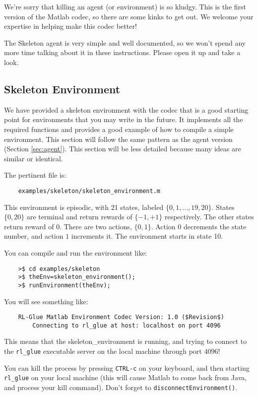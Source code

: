 \documentclass[11pt]{article}
\begin{document}
We're sorry that killing an agent (or environment) is so kludgy.  This is the first version of the Matlab codec, so there are some kinks to get out.  We welcome your expertise in helping 
make this codec better!

The Skeleton agent is very simple and well documented, so we won't spend any more time talking about it in these instructions.
Please open it up and take a look.

\subsection{Skeleton Environment}
\label{sec:env}

We have provided a skeleton environment with the codec that is a good starting point for environments that you may write in the future.
It implements all the required functions and provides a good example of how to compile a simple environment.  This section will follow the same 
pattern as the agent version (Section \ref{sec:agent}).  This section will be less detailed because many ideas are similar or identical.


The pertinent file is:
\begin{verbatim}
	examples/skeleton/skeleton_environment.m
\end{verbatim}

This environment is episodic, with 21 states, labeled $\{0, 1,\ldots,19,20\}$. States $\{0, 20\}$ are terminal and return rewards of $\{-1, +1\}$ respectively.  The other states return reward of $0$.
There are two actions, $\{0, 1\}$.  Action $0$ decrements the state number, and action $1$ increments it. The environment starts in state 10.

You can compile and run the environment like:
\begin{verbatim}
	>$ cd examples/skeleton
	>$ theEnv=skeleton_environment();
	>$ runEnvironment(theEnv);
\end{verbatim}

You will see something like:
\begin{verbatim}
	RL-Glue Matlab Environment Codec Version: 1.0 ($Revision$)
	    Connecting to rl_glue at host: localhost on port 4096
	\end{verbatim}

This means that the skeleton\_environment is running, and trying to connect to the \texttt{rl\_glue} executable server on the local machine through port $4096$! 

You can kill the process by pressing \texttt{CTRL-c} on your keyboard, and then starting  \texttt{rl\_glue} on your local machine (this will cause Matlab to come back from Java, and 
process your kill command).  Don't forget to \texttt{disconnectEnvironment()}.
\end{document}
